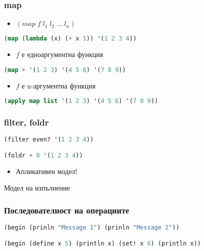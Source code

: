 \documentclass{beamer}
\begin{document}
\begin{frame}[fragile]
\frametitle{map}

\begin{itemize}
  \item $(map \; f \; l_1 \; l_2 \; ... \; l_n)$
\end{itemize}

\begin{lstlisting}[language=Lisp]
(map (lambda (x) (+ x 1)) '(1 2 3 4))
\end{lstlisting}
\begin{itemize}
  \item $f$ е едноаргументна функция
\end{itemize}

\begin{lstlisting}[language=Lisp]
(map + '(1 2 3) '(4 5 6) '(7 8 9))
\end{lstlisting}
\begin{itemize}
  \item $f$ е n-аргументна функция
\end{itemize}

\begin{lstlisting}[language=Lisp]
(apply map list '(1 2 3) '(4 5 6) '(7 8 9))
\end{lstlisting}

\end{frame}


\begin{frame}[fragile]
\frametitle{filter, foldr}

\begin{lstlisting}[language=Lisp]
(filter even? '(1 2 3 4))

(foldr + 0 '(1 2 3 4))
\end{lstlisting}

\begin{itemize}
  \item Апликативен модел!
\end{itemize}

\end{frame}

\begin{frame}
  \centerline{Модел на изпълнение}
\end{frame}


\begin{frame}[fragile]
\frametitle{Последователност на операциите}
\begin{lstlisting}[language=Lisp]
(begin (prinln "Message 1") (prinln "Message 2"))

(begin (define x 5) (println x) (set! x 6) (println x))
\end{lstlisting}
\end{frame}




\end{document}
